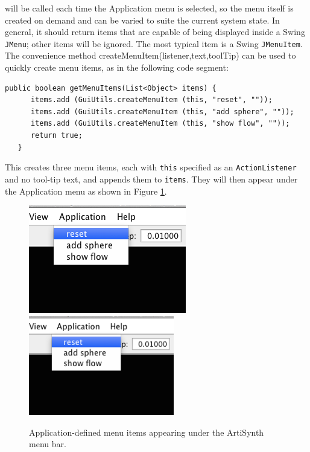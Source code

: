 will be called each time the {\sf Application} menu is selected, so the
menu itself is created on demand and can be varied to suite the
current system state. In general, it should return items that are
capable of being displayed inside a Swing {\tt JMenu}; other items
will be ignored. The most typical item is a Swing {\tt JMenuItem}.  The
convenience method
%
{createMenuItem(listener,text,toolTip)}
can be used to quickly create menu items, as in the following
code segment:
%
\begin{lstlisting}[]
   public boolean getMenuItems(List<Object> items) {
      items.add (GuiUtils.createMenuItem (this, "reset", ""));
      items.add (GuiUtils.createMenuItem (this, "add sphere", ""));
      items.add (GuiUtils.createMenuItem (this, "show flow", ""));
      return true;
   }
\end{lstlisting}
%
This creates three menu items, each with {\tt this} specified as an
{\tt ActionListener} and no tool-tip text, and appends them
to {\tt items}. They will then appear under the {\sf Application}
menu as shown in Figure \ref{applicationMenu:fig}.

\begin{figure}[t]
\begin{center}
\iflatexml
 \includegraphics[]{images/applicationMenu}
\else
 \includegraphics[width=2.5in]{images/applicationMenu}
\fi
\end{center}
\caption{Application-defined menu items appearing under the ArtiSynth
menu bar.}
\label{applicationMenu:fig}
\end{figure}

